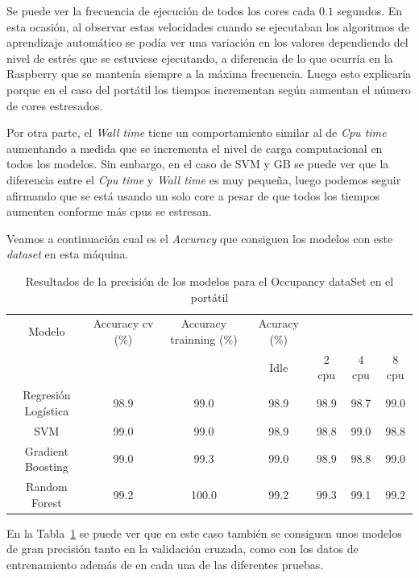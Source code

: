 \documentclass[a4paper, 12pt]{book}
\begin{document}
Se puede ver la frecuencia de ejecución de todos los cores cada $0.1$ segundos. En esta ocasión, al observar estas velocidades cuando se ejecutaban los algoritmos de aprendizaje automático se podía ver una variación en los valores dependiendo del nivel de estrés que se estuviese ejecutando, a diferencia de lo que ocurría en la Raspberry que se mantenía siempre a la máxima frecuencia. Luego esto explicaría porque en el caso del portátil los tiempos incrementan según aumentan el número de cores estresados. 

Por otra parte, el \textit{Wall time} tiene un comportamiento similar al de \textit{Cpu time} aumentando a medida que se incrementa el nivel de carga computacional en todos los modelos. Sin embargo, en el caso de SVM y GB se puede ver que la diferencia entre el \textit{Cpu time} y \textit{Wall time} es muy pequeña, luego podemos seguir afirmando que se está usando un solo core a pesar de que todos los tiempos aumenten conforme más cpus se estresan.

Veamos a continuación cual es el \textit{Accuracy} que consiguen los modelos con este \textit{dataset} en esta máquina.

\begin{table}[]
\begin{adjustbox}{width=\textwidth}
\centering
    \begin{tabular}{c  c  c  c  c  c  c}
    \hline
    Modelo & Accuracy cv (\%) & Accuracy trainning (\%) & Acuracy (\%) & & & \\
    \cline{4-7}
      &  &   &  Idle & 2 cpu & 4 cpu & 8 cpu \\
     \hline
     Regresión Logística & 98.9 & 99.0 & 98.9 & 98.9 & 98.7 & 99.0\\
     SVM & 99.0 & 99.0 & 98.9 & 98.8 & 99.0 & 98.8\\
     Gradient Boosting & 99.0 & 99.3 & 99.0 & 98.9 & 98.8 & 99.0\\
     Random Forest & 99.2 & 100.0 & 99.2 & 99.3 & 99.1 & 99.2\\
    \hline
    \end{tabular}
\end{adjustbox}
\caption{Resultados de la precisión de los modelos para el Occupancy dataSet en el portátil}
\label{tab:acc_Occpc}
\end{table}

En la Tabla~\ref{tab:acc_Occpc} se puede ver que en este caso también se consiguen unos modelos de gran precisión tanto en la validación cruzada, como con los datos de entrenamiento además de en cada una de las diferentes pruebas.
\end{document}
